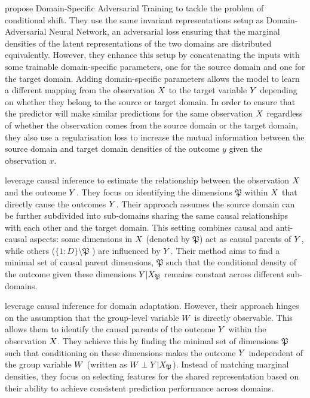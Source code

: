 \documentclass[../thesis.tex]{subfiles}
\begin{document}
\citet{stojanovDomainAdaptationInvariant2021} propose Domain-Specific Adversarial Training to tackle the problem of conditional shift. They use the same invariant representations setup as Domain-Adversarial Neural Network, an adversarial loss ensuring that the marginal densities of the latent representations of the two domains are distributed equivalently. However, they enhance this setup by concatenating the inputs with some trainable domain-specific parameters, one for the source domain and one for the target domain. Adding domain-specific parameters allows the model to learn a different mapping from the observation $\myrv{x}$ to the target variable $\myrv{y}$ depending on whether they belong to the source or target domain. In order to ensure that the predictor will make similar predictions for the same observation $\myrv{x}$ regardless of whether the observation comes from the source domain or the target domain, they also use a regularisation loss to increase the mutual information between the source domain and target domain densities of the outcome $y$ given the observation $x$.

\citet{petersCausalInferenceUsing2016} leverage causal inference to estimate the relationship between the observation $\myrv{x}$ and the outcome $\myrv{y}$. They focus on identifying the dimensions $\mathfrak{P}$ within $\myrv{x}$ that directly cause the outcomes $\myrv{y}$. Their approach assumes the source domain can be further subdivided into sub-domains sharing the same causal relationships with each other and the target domain. This setting combines causal and anti-causal aspects: some dimensions in $\myrv{x}$ (denoted by $\mathfrak{P}$) act as causal parents of $\myrv{y}$, while others ($\{1:D\} \setminus \mathfrak{P}$ ) are influenced by $\myrv{y}$. Their method aims to find a minimal set of causal parent dimensions, $\mathfrak{P}$ such that the conditional density of the outcome given these dimensions $\myrv{y} | \myrv{x}_{\mathfrak{P}}$ remains constant across different sub-domains. 

\citet{magliacane2018domain} leverage causal inference for domain adaptation. However, their approach hinges on the assumption that the group-level variable $\myrv{w}$ is directly observable. This allows them to identify the causal parents of the outcome $\myrv{y}$ within the observation $\myrv{x}$. They achieve this by finding the minimal set of dimensions $\mathfrak{P}$ such that conditioning on these dimensions makes the outcome $\myrv{y}$ independent of the group variable $\myrv{w}$ (written as $\myrv{w} \perp \myrv{y} | \myrv{x}_{\mathfrak{P}}$). Instead of matching marginal densities, they focus on selecting features for the shared representation based on their ability to achieve consistent prediction performance across domains.
\end{document}
